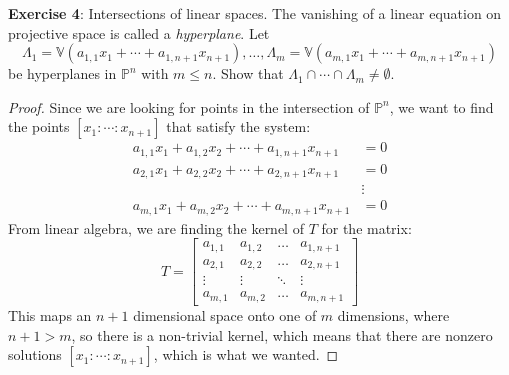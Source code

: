 \documentclass{article}
\begin{document}
\textbf{Exercise 4}: Intersections of linear spaces. The vanishing of a linear equation on projective space is called a \textit{hyperplane}. Let 
    \begin{equation*}
        \Lambda_{1} = \mathbb{V}(a_{1, 1}x_{1} + \cdots + a_{1, n + 1}x_{n + 1}), \ldots, \Lambda_{m} = \mathbb{V}(a_{m, 1}x_{1} + \cdots + a_{m, n + 1}x_{n + 1})
    \end{equation*}
be hyperplanes in $\mathbb{P}^{n}$ with $m \leq n$. Show that $\Lambda_{1} \cap \cdots \cap \Lambda_{m} \neq \emptyset$.
    \begin{proof}
        Since we are looking for points in the intersection of $\mathbb{P}^{n}$, we want to find the points $[x_{1} : \cdots : x_{n + 1}]$ that satisfy the system:
            \begin{align*}
                a_{1, 1}x_{1} + a_{1, 2}x_{2} + \cdots + a_{1, n + 1}x_{n + 1} &=      0 \\
                a_{2, 1}x_{1} + a_{2, 2}x_{2} + \cdots + a_{2, n + 1}x_{n + 1} &=      0 \\
                                                                               &\vdots   \\
                a_{m, 1}x_{1} + a_{m, 2}x_{2} + \cdots + a_{m, n + 1}x_{n + 1} &=      0   
            \end{align*}
        From linear algebra, we are finding the kernel of $T$ for the matrix:
            \begin{equation*}
                T = 
                    \begin{bmatrix}
                        a_{1, 1}  & a_{1, 2} & \ldots  &  a_{1, n + 1} \\
                        a_{2, 1}  & a_{2, 2} & \ldots  &  a_{2, n + 1} \\
                        \vdots    &  \vdots  &  \ddots &  \vdots       \\
                         a_{m, 1} & a_{m, 2} & \ldots  &  a_{m, n + 1}   
                    \end{bmatrix}
            \end{equation*}
        This maps an $n + 1$ dimensional space onto one of $m$ dimensions, where $n + 1 > m$, so there is a non-trivial kernel, which means that there are nonzero solutions $[x_{1} : \cdots : x_{n + 1}]$, which is what we wanted.
    \end{proof}
\end{document}
